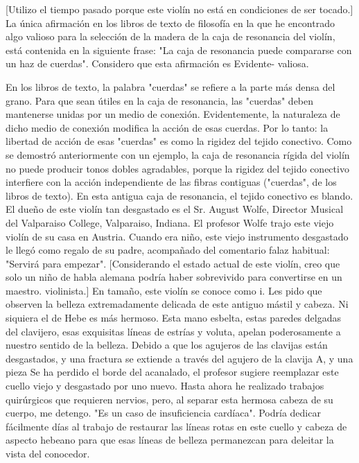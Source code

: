 [Utilizo el tiempo pasado porque este violín no está en condiciones de ser tocado.]
La única afirmación en los libros de texto de filosofía en la que he encontrado algo valioso para la selección de la madera de la caja de resonancia del violín, está contenida en la siguiente frase: "La caja de resonancia puede compararse con un haz de cuerdas".
Considero que esta afirmación es Evidente- valiosa.

En los libros de texto, la palabra "cuerdas" se refiere a la parte más densa del grano. Para que sean útiles en la caja de resonancia, las "cuerdas" deben mantenerse unidas por un medio de conexión. Evidentemente, la naturaleza de dicho medio de conexión modifica la acción de esas cuerdas. Por lo tanto: la libertad de acción de esas "cuerdas" es como la rigidez del tejido conectivo. Como se demostró anteriormente con un ejemplo, la caja de resonancia rígida del violín no puede producir tonos dobles agradables, porque la rigidez del tejido conectivo interfiere con la acción independiente de las fibras contiguas ("cuerdas", de los libros de texto). En esta antigua caja de resonancia, el tejido conectivo es blando.
El dueño de este violín tan desgastado es el Sr. August Wolfe, Director Musical del Valparaiso College, Valparaiso, Indiana. El profesor Wolfe trajo este viejo violín de su casa en Austria. Cuando era niño, este viejo instrumento desgastado le llegó como regalo de su padre, acompañado del comentario falaz habitual: "Servirá para empezar". [Considerando el estado actual de este violín, creo que solo un niño de habla alemana podría haber sobrevivido para convertirse en un maestro.
violinista.]
En tamaño, este violín se conoce como i. Les pido que observen la belleza extremadamente delicada de este antiguo mástil y cabeza. Ni siquiera el de Hebe es más hermoso. Esta mano esbelta, estas paredes delgadas del clavijero, esas exquisitas líneas de estrías y voluta, apelan poderosamente a nuestro sentido de la belleza. Debido a que los agujeros de las clavijas están desgastados, y una fractura se extiende a través del agujero de la clavija A, y una pieza
Se ha perdido el borde del acanalado, el profesor sugiere reemplazar este cuello viejo y desgastado por uno nuevo. Hasta ahora he realizado trabajos quirúrgicos que requieren nervios, pero, al separar esta hermosa cabeza de su cuerpo, me detengo. "Es un caso de insuficiencia cardíaca". Podría dedicar fácilmente días al trabajo de restaurar las líneas rotas en este cuello y cabeza de aspecto hebeano para que esas líneas de belleza permanezcan para deleitar la vista del conocedor.

